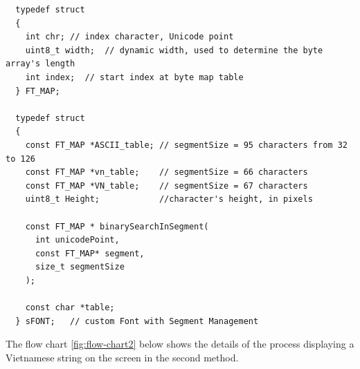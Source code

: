 \documentclass[../Main.tex]{subfiles}
\begin{document}
{\fontsize{8pt}{8pt}\selectfont 
    \begin{verbatim}
  typedef struct 
  {
    int chr; // index character, Unicode point
    uint8_t width;  // dynamic width, used to determine the byte array's length
    int index;  // start index at byte map table
  } FT_MAP;

  typedef struct
  {    
    const FT_MAP *ASCII_table; // segmentSize = 95 characters from 32 to 126
    const FT_MAP *vn_table;    // segmentSize = 66 characters
    const FT_MAP *VN_table;    // segmentSize = 67 characters
    uint8_t Height;            //character's height, in pixels
  
    const FT_MAP * binarySearchInSegment(
      int unicodePoint, 
      const FT_MAP* segment, 
      size_t segmentSize
    );
    
    const char *table;
  } sFONT;   // custom Font with Segment Management
    \end{verbatim}
}

 The flow chart \ref{fig:flow-chart2} below shows the details of the process displaying a Vietnamese string on the screen in the second method.
\end{document}
